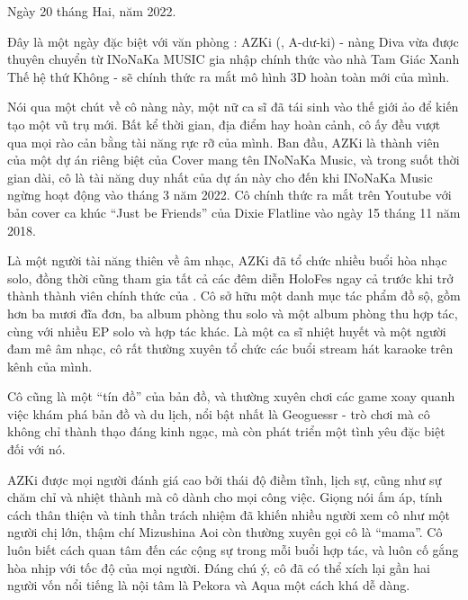 \documentclass[../main.tex]{subfiles}
\begin{document}
Ngày 20 tháng Hai, năm 2022.

Đây là một ngày đặc biệt với văn phòng \hll: AZKi (, A-dư-ki) - nàng Diva vừa được thuyên chuyển từ INoNaKa MUSIC gia nhập chính thức vào nhà Tam Giác Xanh Thế hệ thứ Không - sẽ chính thức ra mắt mô hình 3D hoàn toàn mới của mình.

\chrint

Nói qua một chút về cô nàng này, một nữ ca sĩ đã tái sinh vào thế giới ảo để kiến tạo một vũ trụ mới. Bất kể thời gian, địa điểm hay hoàn cảnh, cô ấy đều vượt qua mọi rào cản bằng tài năng rực rỡ của mình. Ban đầu, AZKi là thành viên của một dự án riêng biệt của Cover mang tên INoNaKa Music, và trong suốt thời gian dài, cô là tài năng duy nhất của dự án này cho đến khi INoNaKa Music ngừng hoạt động vào tháng 3 năm 2022. Cô chính thức ra mắt trên Youtube với bản cover ca khúc ``Just be Friends'' của Dixie Flatline vào ngày 15 tháng 11 năm 2018.

Là một người tài năng thiên về âm nhạc, AZKi đã tổ chức nhiều buổi hòa nhạc solo, đồng thời cũng tham gia tất cả các đêm diễn HoloFes ngay cả trước khi trở thành thành viên chính thức của \hll. Cô sở hữu một danh mục tác phẩm đồ sộ, gồm hơn ba mươi đĩa đơn, ba album phòng thu solo và một album phòng thu hợp tác, cùng với nhiều EP solo và hợp tác khác. Là một ca sĩ nhiệt huyết và một người đam mê âm nhạc, cô rất thường xuyên tổ chức các buổi stream hát karaoke trên kênh của mình.

Cô cũng là một ``tín đồ'' của bản đồ, và thường xuyên chơi các game xoay quanh việc khám phá bản đồ và du lịch, nổi bật nhất là Geoguessr - trò chơi mà cô không chỉ thành thạo đáng kinh ngạc, mà còn phát triển một tình yêu đặc biệt đối với nó.


AZKi được mọi người đánh giá cao bởi thái độ điềm tĩnh, lịch sự, cũng như sự chăm chỉ và nhiệt thành mà cô dành cho mọi công việc. Giọng nói ấm áp, tính cách thân thiện và tinh thần trách nhiệm đã khiến nhiều người xem cô như một người chị lớn, thậm chí Mizushina Aoi còn thường xuyên gọi cô là ``mama''. Cô luôn biết cách quan tâm đến các cộng sự trong mỗi buổi hợp tác, và luôn cố gắng hòa nhịp với tốc độ của mọi người. Đáng chú ý, cô đã có thể xích lại gần hai người vốn nổi tiếng là nội tâm là Pekora và Aqua một cách khá dễ dàng.
\end{document}
